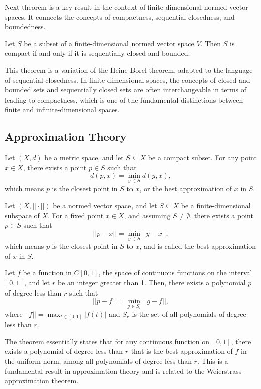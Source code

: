 Next theorem is a key result in the context of finite-dimensional normed vector spaces. It connects the concepts of compactness, sequential closedness, and boundedness.
\begin{theorem}
    Let \( S \) be a subset of a finite-dimensional normed vector space \( V \). Then \( S \) is compact if and only if it is sequentially closed and bounded.
\end{theorem}

This theorem is a variation of the Heine-Borel theorem, adapted to the language of sequential closedness. In finite-dimensional spaces, the concepts of closed and bounded sets and sequentially closed sets are often interchangeable in terms of leading to compactness, which is one of the fundamental distinctions between finite and infinite-dimensional spaces.

\subsection{Approximation Theory}

Let \( (X, d) \) be a metric space, and let \( S \subseteq X \) be a compact subset. For any point \( x \in X \), there exists a point \( p \in S \) such that 
    \[
    d(p, x) = \min_{y \in S} d(y, x),
    \]
which means \( p \) is the closest point in \( S \) to \( x \), or the best approximation of \( x \) in \( S \).



\begin{theorem}
    Let \( (X, ||\cdot||) \) be a normed vector space, and let \( S \subseteq X \) be a finite-dimensional subspace of \( X \). For a fixed point \( x \in X \), and assuming \( S \neq \emptyset \), there exists a point \( p \in S \) such that 
    \[
    ||p - x|| = \min_{y \in S} ||y - x||,
    \]
    which means \( p \) is the closest point in \( S \) to \( x \), and is called the best approximation of \( x \) in \( S \).
\end{theorem}

\begin{proposition}
    Let \( f \) be a function in \( C[0,1] \), the space of continuous functions on the interval \([0,1]\), and let \( r \) be an integer greater than 1. Then, there exists a polynomial \( p \) of degree less than \( r \) such that
    \[
    ||p - f|| = \min_{g \in S_r} ||g - f||,
    \]
    where \( ||f|| = \max_{t \in [0,1]} |f(t)| \) and \( S_r \) is the set of all polynomials of degree less than \( r \).
\end{proposition}

The theorem essentially states that for any continuous function on 
$[0,1]$, there exists a polynomial of degree less than
$r$ that is the best approximation of 
$f$ in the uniform norm, among all polynomials of degree less than $r$. This is a fundamental result in approximation theory and is related to the Weierstrass approximation theorem.